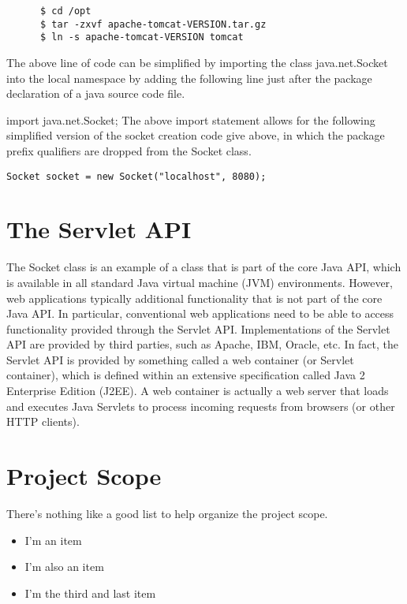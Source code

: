 {\small
\begin{verbatim}
	  $ cd /opt
	  $ tar -zxvf apache-tomcat-VERSION.tar.gz
	  $ ln -s apache-tomcat-VERSION tomcat
\end{verbatim}
}

The above line of code can be simplified by importing the class java.net.Socket into the local namespace by adding the following line just after the package declaration of a java source code file.

import java.net.Socket;
The above import statement allows for the following simplified version of the socket creation code give above, in which the package prefix qualifiers are dropped from the Socket class.

{\small
\begin{verbatim}
Socket socket = new Socket("localhost", 8080);
\end{verbatim}
}

\section{The Servlet API}

The Socket class is an example of a class that is part of the core Java API, which is available in all standard Java virtual machine (JVM) environments. However, web applications typically additional functionality that is not part of the core Java API. In particular, conventional web applications need to be able to access functionality provided through the Servlet API. Implementations of the Servlet API are provided by third parties, such as Apache, IBM, Oracle, etc. In fact, the Servlet API is provided by something called a web container (or Servlet container), which is defined within an extensive specification called Java 2 Enterprise Edition (J2EE). A web container is actually a web server that loads and executes Java Servlets to process incoming requests from browsers (or other HTTP clients).

\section{Project Scope}

There's nothing like a good list to help organize the project scope.

\begin{itemize}
    \item I'm an item
    \item I'm also an item
    \item I'm the third and last item
\end{itemize}

